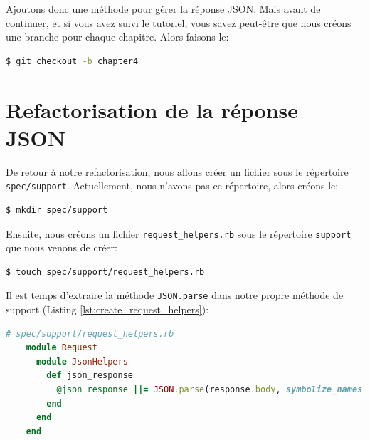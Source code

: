 \documentclass[]{report}
\begin{document}
  Ajoutons donc une méthode pour gérer la réponse JSON. Mais avant de continuer, et si vous avez suivi le tutoriel, vous savez peut-être que nous créons une branche pour chaque chapitre. Alors faisons-le:

  \begin{scriptsize}
  \begin{lstlisting}[language=bash]
  $ git checkout -b chapter4
  \end{lstlisting}
  \end{scriptsize}

  \section{Refactorisation de la réponse JSON}\label{sec:refactoring_json_response}

    De retour à notre refactorisation, nous allons créer un fichier sous le répertoire \verb|spec/support|. Actuellement, nous n'avons pas ce répertoire, alors créons-le:

    \begin{scriptsize}
    \begin{lstlisting}[language=bash]
    $ mkdir spec/support
    \end{lstlisting}
    \end{scriptsize}

    Ensuite, nous créons un fichier \verb|request_helpers.rb| sous le répertoire \verb|support| que nous venons de créer:

    \begin{scriptsize}
    \begin{lstlisting}[language=bash]
    $ touch spec/support/request_helpers.rb
    \end{lstlisting}
    \end{scriptsize}

    Il est temps d'extraire la méthode \verb|JSON.parse| dans notre propre méthode de support (Listing \ref{lst:create_request_helpers}):

    \begin{scriptsize}
    \begin{lstlisting}[language=ruby, caption={Extraction de la méthode JSON.parse}, label={lst:create_request_helpers}]
    # spec/support/request_helpers.rb
    module Request
      module JsonHelpers
        def json_response
          @json_response ||= JSON.parse(response.body, symbolize_names: true)
        end
      end
    end
    \end{lstlisting}
    \end{scriptsize}
\end{document}
